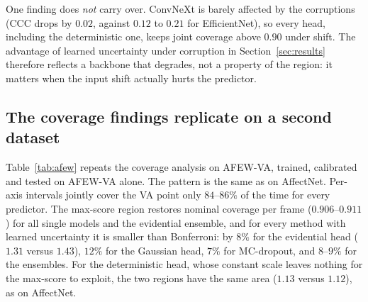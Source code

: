 One finding does \emph{not} carry over. ConvNeXt is barely affected by the
corruptions (CCC drops by $0.02$, against $0.12$ to $0.21$ for EfficientNet), so
every head, including the deterministic one, keeps joint coverage above $0.90$
under shift. The advantage of learned uncertainty under corruption in
Section~\ref{sec:results} therefore reflects a backbone that degrades, not a
property of the region: it matters when the input shift actually hurts the
predictor.

\begin{table}[h]
  \centering\small
  \resizebox{\linewidth}{!}{}
  \caption{Main claims on two backbones (mean$_{\pm\text{std}}$ over seeds;
  nominal $90\%$). Per-axis: joint coverage of per-axis intervals. Joint and
  Area: max-score region. Area (Bonf.): Bonferroni region with the same
  guarantee. Worst: lowest joint coverage over seen expressions. Contempt and
  Shift: joint coverage of the max-score region on the unseen expression and on
  corrupted images.}
  \label{tab:backbone}
\end{table}

\subsection{The coverage findings replicate on a second dataset}
\label{sec:afew}
Table~\ref{tab:afew} repeats the coverage analysis on AFEW-VA, trained,
calibrated and tested on AFEW-VA alone. The pattern is the same as on AffectNet.
Per-axis intervals jointly cover the VA point only $84$--$86\%$ of the time for
every predictor. The max-score region restores nominal coverage per frame
($0.906$--$0.911$) for all single models and the evidential ensemble, and for
every method with learned uncertainty it is smaller than Bonferroni: by $8\%$ for
the evidential head ($1.31$ versus $1.43$), $12\%$ for the Gaussian head, $7\%$
for MC-dropout, and $8$--$9\%$ for the ensembles. For the deterministic head,
whose constant scale leaves nothing for the max-score to exploit, the two
regions have the same area ($1.13$ versus $1.12$), as on AffectNet.

